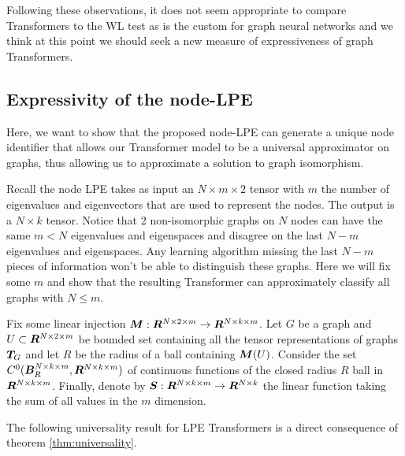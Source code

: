 \documentclass{article}
\def\eigvec{{\bm{\phi}}}
\begin{document}
Following these observations, it does not seem appropriate to compare Transformers to the WL test as is the custom for graph neural networks and we think at this point we should seek a new measure of expressiveness of graph Transformers.


\subsection{Expressivity of the node-LPE}

Here, we want to show that the proposed node-LPE can generate a unique node identifier that allows our Transformer model to be a universal approximator on graphs, thus allowing us to approximate a solution to graph isomorphism.


Recall the node LPE takes as input an $N\times m \times 2$ tensor with $m$ the number of eigenvalues and eigenvectors that are used to represent the nodes. The output is a $N  \times k$ tensor. Notice that 2 non-isomorphic graphs on $N$ nodes can have the same $m < N$ eigenvalues and eigenspaces and disagree on the last $N-m$ eigenvalues and eigenspaces. Any learning algorithm missing the last $N-m$ pieces of information won't be able to distinguish these graphs. Here we will fix some $m$ and show that the resulting Transformer can approximately classify all graphs with $N \leq m$.

Fix some linear injection ${\bm{M}}:{\bm{R}}^{N\times 2\times m} \to {\bm{R}}^{N\times k\times m}$. Let $G$ be a graph and $U \subset {\bm{R}}^{N\times 2\times m}$ be bounded set containing all the tensor representations of graphs ${\bm{T}}_G$ and let $R$ be the radius of a ball containing ${\bm{M}}(U)$. Consider the set $C^0({\bm{B}}_R^{N\times k\times m}, {\bm{R}}^{N\times k\times m}) $ of continuous functions of the closed radius $R$ ball in ${\bm{R}}^{N\times k\times m}$. 
Finally, denote by ${\bm{S}}: {\bm{R}}^{N\times k \times m} \to {\bm{R}}^{N\times k }$ the linear function taking the sum of all values in the $m$ dimension.
\newtheorem{proposition}{Proposition}
The following universality result for LPE Transformers is a direct consequence of theorem \ref{thm:universality}.
\end{document}
